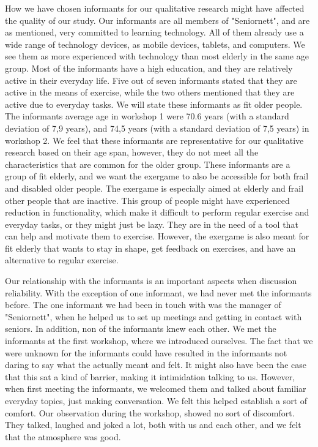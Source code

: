 How we have chosen informants for our qualitative research might have affected the quality of our study. Our informants are all members of "Seniornett", and are as mentioned, very committed to learning technology. All of them already use a wide range of technology devices, as mobile devices, tablets, and computers. We see them as more experienced with technology than most elderly in the same age group. Most of the informants have a high education, and they are relatively active in their everyday life. Five out of seven informants stated that they are active in the means of exercise, while the two others mentioned that they are active due to everyday tasks. We will state these informants as fit older people. The informants average age in workshop 1 were 70.6 years (with a standard deviation of 7,9 years), and 74,5 years (with a standard deviation of 7,5 years) in workshop 2. We feel that these informants are representative for our qualitative research based on their age span, however, they do not meet all the characteristics that are common for the older group. These informants are a group of fit elderly, and we want the exergame to also be accessible for both frail and disabled older people. The exergame is especially aimed at elderly and frail other people that are inactive. This group of people might have experienced reduction in functionality, which make it difficult to perform regular exercise and everyday tasks, or they might just be lazy. They are in the need of a tool that can help and motivate them to exercise. However, the exergame is also meant for fit elderly that wants to stay in shape, get feedback on exercises, and have an alternative to regular exercise. 

Our relationship with the informants is an important aspects when discussion reliability. With the exception of one informant, we had never met the informants before. The one informant we had been in touch with was the manager of "Seniornett", when he helped us to set up meetings and getting in contact with seniors. In addition, non of the informants knew each other. We met the informants at the first workshop, where we introduced ourselves. The fact that we were unknown for the informants could have resulted in the informants not daring to say what the actually meant and felt. It might also have been the case that this sat a kind of barrier, making it intimidation talking to us. However, when first meeting the informants, we welcomed them and talked about familiar everyday topics, just making conversation. We felt this helped establish a sort of comfort. Our observation during the workshop, showed no sort of discomfort. They talked, laughed and joked a lot, both with us and each other, and we felt that the atmosphere was good. 

